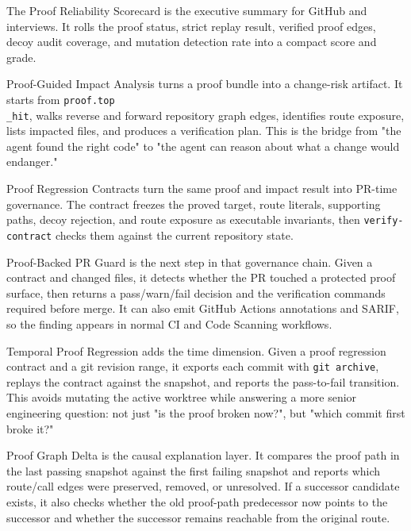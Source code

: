\documentclass[UTF8,12pt,openany]{ctexbook}
\begin{document}
The Proof Reliability Scorecard is the executive summary for GitHub and interviews. It rolls the proof status, strict replay result, verified proof edges, decoy audit coverage, and mutation detection rate into a compact score and grade.\par

Proof-Guided Impact Analysis turns a proof bundle into a change-risk artifact. It starts from \texttt{proof.top\\_hit}, walks reverse and forward repository graph edges, identifies route exposure, lists impacted files, and produces a verification plan. This is the bridge from "the agent found the right code" to "the agent can reason about what a change would endanger."\par

Proof Regression Contracts turn the same proof and impact result into PR-time governance. The contract freezes the proved target, route literals, supporting paths, decoy rejection, and route exposure as executable invariants, then \texttt{verify-contract} checks them against the current repository state.\par

Proof-Backed PR Guard is the next step in that governance chain. Given a contract and changed files, it detects whether the PR touched a protected proof surface, then returns a pass/warn/fail decision and the verification commands required before merge. It can also emit GitHub Actions annotations and SARIF, so the finding appears in normal CI and Code Scanning workflows.\par

Temporal Proof Regression adds the time dimension. Given a proof regression contract and a git revision range, it exports each commit with \texttt{git archive}, replays the contract against the snapshot, and reports the pass-to-fail transition. This avoids mutating the active worktree while answering a more senior engineering question: not just "is the proof broken now?", but "which commit first broke it?"\par

Proof Graph Delta is the causal explanation layer. It compares the proof path in the last passing snapshot against the first failing snapshot and reports which route/call edges were preserved, removed, or unresolved. If a successor candidate exists, it also checks whether the old proof-path predecessor now points to the successor and whether the successor remains reachable from the original route.\par
\end{document}
